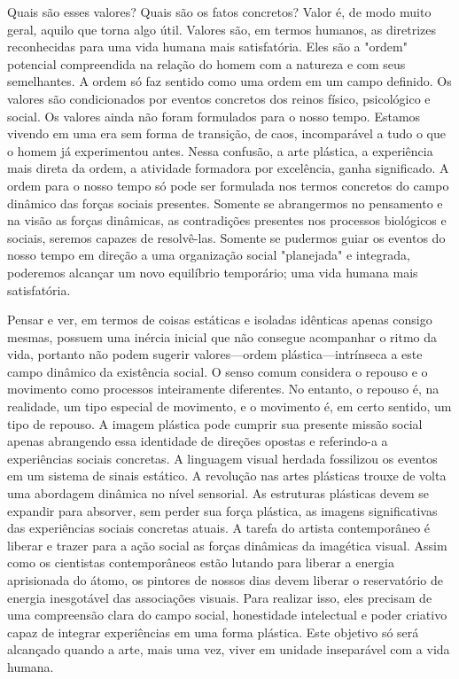 \documentclass[a4paper]{article}
\begin{document}
Quais são esses valores? Quais são os fatos concretos? Valor é, de modo muito geral, aquilo que torna algo útil. Valores são, em termos humanos, as diretrizes reconhecidas para uma vida humana mais satisfatória. Eles são a "ordem" potencial compreendida na relação do homem com a natureza e com seus semelhantes. A ordem só faz sentido como uma ordem em um campo definido. Os valores são condicionados por eventos concretos dos reinos físico, psicológico e social. Os valores ainda não foram formulados para o nosso tempo. Estamos vivendo em uma era sem forma de transição, de caos, incomparável a tudo o que o homem já experimentou antes. Nessa confusão, a arte plástica, a experiência mais direta da ordem, a atividade formadora por excelência, ganha significado. A ordem para o nosso tempo só pode ser formulada nos termos concretos do campo dinâmico das forças sociais presentes. Somente se abrangermos no pensamento e na visão as forças dinâmicas, as contradições presentes nos processos biológicos e sociais, seremos capazes de resolvê-las. Somente se pudermos guiar os eventos do nosso tempo em direção a uma organização social "planejada" e integrada, poderemos alcançar um novo equilíbrio temporário; uma vida humana mais satisfatória.

Pensar e ver, em termos de coisas estáticas e isoladas idênticas apenas consigo mesmas, possuem uma inércia inicial que não consegue acompanhar o ritmo da vida, portanto não podem sugerir valores---ordem plástica---intrínseca a este campo dinâmico da existência social. O senso comum considera o repouso e o movimento como processos inteiramente diferentes. No entanto, o repouso é, na realidade, um tipo especial de movimento, e o movimento é, em certo sentido, um tipo de repouso. A imagem plástica pode cumprir sua presente missão social apenas abrangendo essa identidade de direções opostas e referindo-a a experiências sociais concretas. A linguagem visual herdada fossilizou os eventos em um sistema de sinais estático. A revolução nas artes plásticas trouxe de volta uma abordagem dinâmica no nível sensorial. As estruturas plásticas devem se expandir para absorver, sem perder sua força plástica, as imagens significativas das experiências sociais concretas atuais. A tarefa do artista contemporâneo é liberar e trazer para a ação social as forças dinâmicas da imagética visual. Assim como os cientistas contemporâneos estão lutando para liberar a energia aprisionada do átomo, os pintores de nossos dias devem liberar o reservatório de energia inesgotável das associações visuais. Para realizar isso, eles precisam de uma compreensão clara do campo social, honestidade intelectual e poder criativo capaz de integrar experiências em uma forma plástica. Este objetivo só será alcançado quando a arte, mais uma vez, viver em unidade inseparável com a vida humana.
\end{document}
